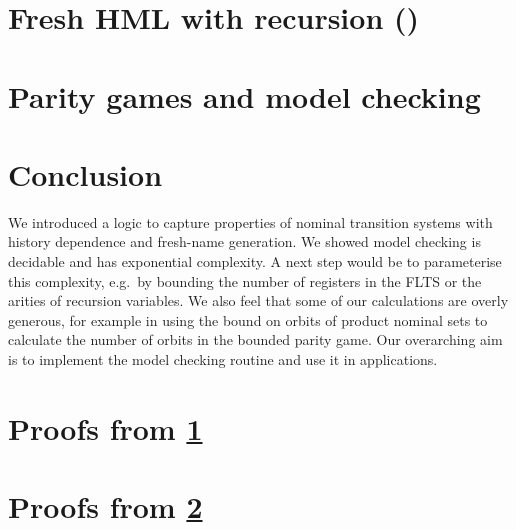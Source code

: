 \documentclass[a4paper,UKenglish,cleveref, autoref, thm-restate]{lipics-v2021}
\begin{document}
% 

\section{Fresh HML with recursion (\fhml)}\label{sec:logic}


\section{Parity games and model checking}\label{sec:modelchecking}
% 

\section{Conclusion}

We introduced a logic to capture properties of nominal transition systems with history dependence and fresh-name generation. We showed model checking is decidable and has exponential complexity. A next step would be to parameterise this complexity, e.g.\ by bounding the number of registers in the FLTS or the arities of recursion variables. We also feel that some of our calculations are overly generous, for example in using the bound on orbits of product nominal sets to calculate the number of orbits in the bounded parity game. Our overarching aim is to implement the model checking routine and use it in applications.


\newpage
\appendix
\section{Proofs from \cref{sec:logic}}

\section{Proofs from \cref{sec:modelchecking}}

\end{document}
